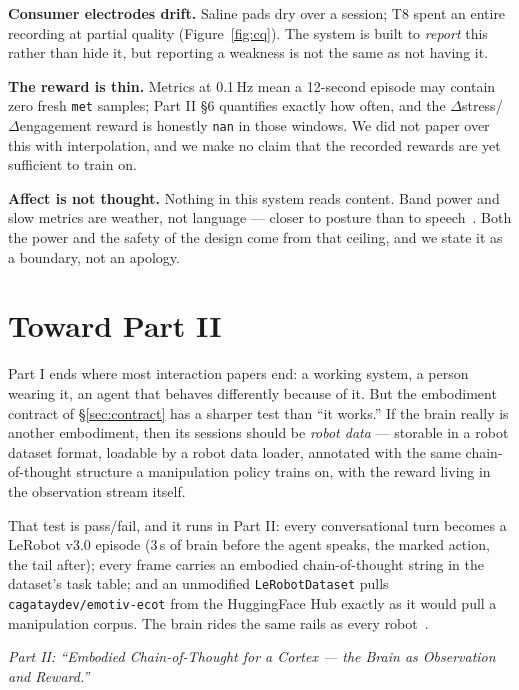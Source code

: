 \documentclass{article}
\begin{document}
\textbf{Consumer electrodes drift.} Saline pads dry over a session; T8 spent an entire recording at partial quality (Figure~\ref{fig:cq}). The system is built to \emph{report} this rather than hide it, but reporting a weakness is not the same as not having it.

\textbf{The reward is thin.} Metrics at 0.1\,Hz mean a 12-second episode may contain zero fresh \texttt{met} samples; Part II \S6 quantifies exactly how often, and the $\Delta$stress/$\Delta$engagement reward is honestly \texttt{nan} in those windows. We did not paper over this with interpolation, and we make no claim that the recorded rewards are yet sufficient to train on.

\textbf{Affect is not thought.} Nothing in this system reads content. Band power and slow metrics are weather, not language --- closer to posture than to speech~\cite{picard1997affective}. Both the power and the safety of the design come from that ceiling, and we state it as a boundary, not an apology.

\section{Toward Part II}
\label{sec:towards}

Part I ends where most interaction papers end: a working system, a person wearing it, an agent that behaves differently because of it. But the embodiment contract of \S\ref{sec:contract} has a sharper test than ``it works.'' If the brain really is another embodiment, then its sessions should be \emph{robot data} --- storable in a robot dataset format, loadable by a robot data loader, annotated with the same chain-of-thought structure a manipulation policy trains on, with the reward living in the observation stream itself.

That test is pass/fail, and it runs in Part II: every conversational turn becomes a LeRobot v3.0 episode (3\,s of brain before the agent speaks, the marked action, the tail after); every frame carries an embodied chain-of-thought string in the dataset's task table; and an unmodified \texttt{LeRobotDataset} pulls \texttt{cagataydev/emotiv-ecot} from the HuggingFace Hub exactly as it would pull a manipulation corpus. The brain rides the same rails as every robot~\cite{cadene2024lerobot,zawalski2024ecot}.

\vspace{2mm}
\noindent\emph{Part II: ``Embodied Chain-of-Thought for a Cortex --- the Brain as Observation and Reward.''}



\end{document}

